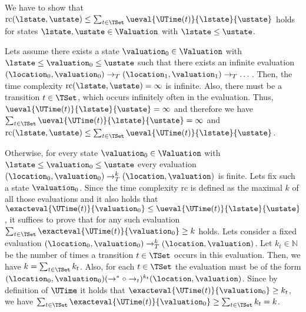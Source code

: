 We have to show that $\text{rc}(\lstate, \ustate) \leq \sum_{t \in \TSet} \ueval{\UTime(t)}{\lstate}{\ustate}$ holds for states $\lstate, \ustate \in \Valuation$ with $\lstate \leq \ustate$.

Lets assume there exists a state $\valuation_0 \in \Valuation$ with $\lstate \leq \valuation_0 \leq \ustate$ such that there exists an infinite evaluation $(\location_0, \valuation_0) \rightarrow_T (\location_1, \valuation_1) \rightarrow_T \dots$.
Then, the time complexity $\text{rc}(\lstate, \ustate) = \infty$ is infinite.
Also, there must be a transition $t \in \TSet$, which occurs infinitely often in the evaluation.
Thus, $\ueval{\UTime(t)}{\lstate}{\ustate} = \infty$ and therefore we have $\sum_{t \in \TSet} \ueval{\UTime(t)}{\lstate}{\ustate} = \infty$ and $\text{rc}(\lstate, \ustate) \leq \sum_{t \in \TSet} \ueval{\UTime(t)}{\lstate}{\ustate}$.

Otherwise, for every state $\valuation_0 \in \Valuation$ with $\lstate \leq \valuation_0 \leq \ustate$ every evaluation $(\location_0, \valuation_0) \rightarrow^k_T (\location, \valuation)$ is finite.
Lets fix such a state $\valuation_0$.
Since the time complexity $\text{rc}$ is defined as the maximal $k$ of all those evaluations and it also holds that $\exacteval{\UTime(t)}{\valuation_0} \leq \ueval{\UTime(t)}{\lstate}{\ustate}$, it suffices to prove that for any such evaluation $\sum_{t \in \TSet} \exacteval{\UTime(t)}{\valuation_0} \geq k$ holds.
Lets consider a fixed evaluation $(\location_0, \valuation_0) \rightarrow^k_T (\location, \valuation)$.
Let $k_t \in \mathbb{N}$ be the number of times a transition $t \in \TSet$ occurs in this evaluation.
Then, we have $k = \sum_{t \in \TSet} k_t$.
Also, for each $t \in \TSet$ the evaluation must be of the form $(\location_0, \valuation_0) (\rightarrow^* \circ \rightarrow_t)^{k_t} (\location, \valuation)$.
Since by definition of $\UTime$ it holds that $\exacteval{\UTime(t)}{\valuation_0} \geq k_t$, we have $\sum_{t \in \TSet} \exacteval{\UTime(t)}{\valuation_0} \geq \sum_{t \in \TSet} k_t = k$.
